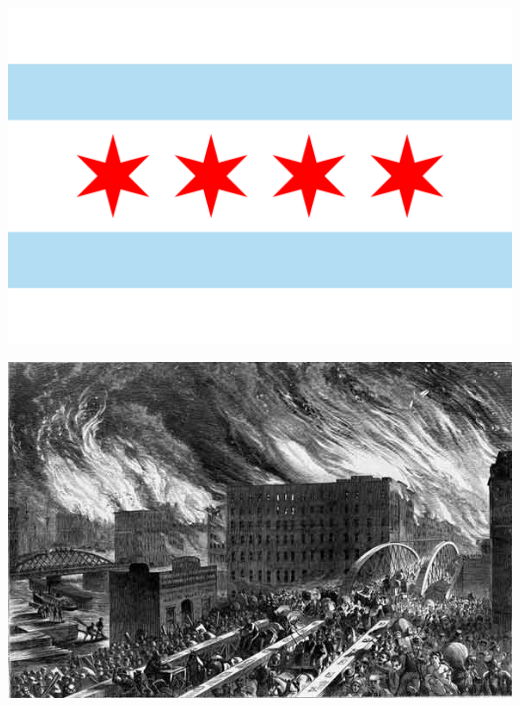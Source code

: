 \documentclass{beamer}
\begin{document}
\begin{frame}
  \begin{center}
    \includegraphics[width=\textwidth,height=0.8\textheight,keepaspectratio=true]{chicago_flag}
  \end{center}
\end{frame}

\begin{frame}
  \begin{center}
    \includegraphics[width=\textwidth,height=0.8\textheight,keepaspectratio=true]{chicago_fire_1}
  \end{center}
\end{frame}
\end{document}
